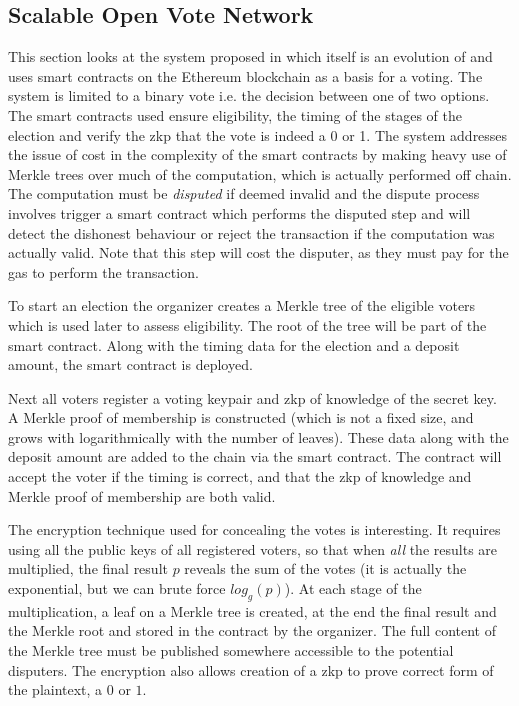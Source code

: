 \subsection{Scalable Open Vote Network}

This section looks at the system proposed in \cite{seifelnasrScalableOpenVoteNetwork2020} which itself is an evolution of \cite{mccorrySmartContractBoardroom2017} and uses smart contracts on the Ethereum blockchain as a basis for a voting. The system is limited to a binary vote i.e. the decision between one of two options. The smart contracts used ensure eligibility, the timing of the stages of the election and verify the \gls{zkp} that the vote is indeed a 0 or 1. The system addresses the issue of cost in the complexity of the smart contracts by making heavy use of Merkle trees over much of the computation, which is actually performed off chain. The computation must be \emph{disputed} if deemed invalid and the dispute process involves trigger a smart contract which performs the disputed step and will detect the dishonest behaviour or reject the transaction if the computation was actually valid. Note that this step will cost the disputer, as they must pay for the gas to perform the transaction.

To start an election the organizer creates a Merkle tree of the eligible voters which is used later to assess eligibility. The root of the tree will be part of the smart contract. Along with the timing data for the election and a deposit amount, the smart contract is deployed.

Next all voters register a voting keypair and \gls{zkp} of knowledge of the secret key. A Merkle proof of membership is constructed (which is not a fixed size, and grows with logarithmically with the number of leaves). These data along with the deposit amount are added to the chain via the smart contract. The contract will accept the voter if the timing is correct, and that the \gls{zkp} of knowledge and Merkle proof of membership are both valid.

The encryption technique used for concealing the votes is interesting. It requires using all the public keys of all registered voters, so that when \emph{all} the results are multiplied, the final result $p$ reveals the sum of the votes (it is actually the exponential, but we can brute force $log_g(p)$). At each stage of the multiplication, a leaf on a Merkle tree is created, at the end the final result and the Merkle root and stored in the contract by the organizer. The full content of the Merkle tree must be published somewhere accessible to the potential disputers. The encryption also allows creation of a \gls{zkp} to prove correct form of the plaintext, a $0$ or $1$.

